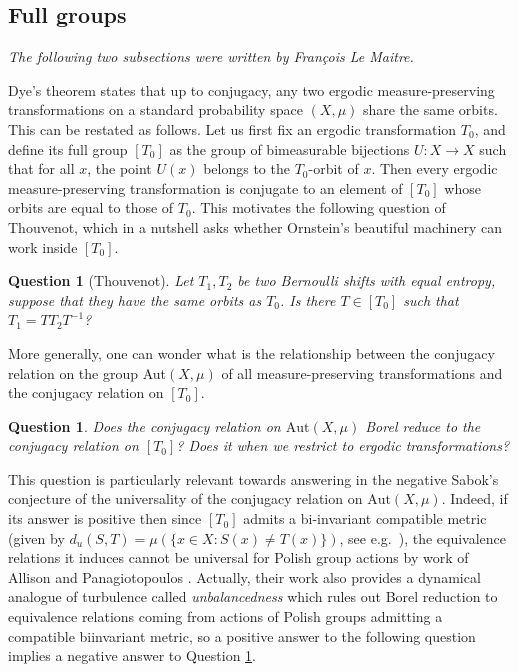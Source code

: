 \documentclass{article}
\newtheorem{question}[theorem]{Question}
\theoremstyle{definition}
\begin{document}
\subsection{Full groups}
\textit{The following two subsections were written by François Le Maitre.}

Dye's theorem states that up to conjugacy, any two ergodic measure-preserving transformations on a standard probability space $(X,\mu)$ share the same orbits. 
This can be restated as follows. Let us first fix an ergodic transformation $T_0$, and define its full group $[T_0]$ as the group of bimeasurable bijections $U:X\to X$ such that for all $x$, the point $U(x)$ belongs to the $T_0$-orbit of $x$. Then every ergodic measure-preserving transformation is conjugate to an element of $[T_0]$ whose orbits are equal to those of $T_0$.
This motivates the following question of Thouvenot, which in a nutshell asks whether Ornstein's beautiful machinery can work inside $[T_0]$.

\begin{question}[Thouvenot]
	Let $T_1,T_2$ be two Bernoulli shifts with equal entropy, suppose that they have the same orbits as $T_0$. Is there $T\in[T_0]$ such that $T_1=TT_2T^{-1}$?
\end{question}

More generally, one can wonder what is the relationship between the conjugacy relation on the group Aut$(X,\mu)$ of all measure-preserving transformations and the conjugacy relation on $[T_0]$. 

\begin{question}\label{qu: red Aut to full}
	Does the conjugacy relation on $\mathrm{Aut}(X,\mu)$ Borel reduce to the conjugacy relation on $[T_0]$? Does it when we restrict to ergodic transformations?
\end{question}

This question is particularly relevant towards answering in the negative Sabok's conjecture of the universality of the conjugacy relation on $\mathrm{Aut}(X,\mu)$. Indeed, if its answer is positive then since $[T_0]$ admits a bi-invariant compatible metric (given by $d_u(S,T)=\mu(\{x\in X\colon S(x)\neq T(x)\})$, see e.g.~\cite[Prop.~3.2]{kechrisGlobalaspectsergodic2010}), the equivalence relations it induces cannot be universal for Polish group actions by work of Allison and Panagiotopoulos \cite{allisonDynamicalObstructionsClassification2021}. Actually, their work also provides a dynamical analogue of turbulence called \emph{unbalancedness} which rules out Borel reduction to equivalence relations coming from actions of Polish groups admitting a compatible biinvariant metric, so a positive answer to the following question implies a negative answer to Question \ref{qu: red Aut to full}.
\end{document}
